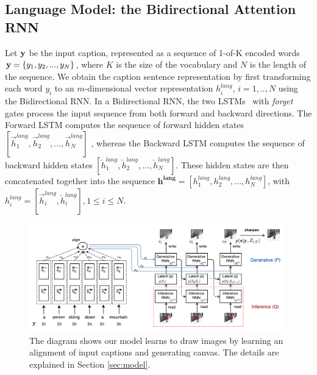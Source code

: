 \documentclass{article} %
\newcommand{\hlang}{h^{lang}}
\newcommand{\hlangall}{\boldsymbol{h^{lang}}}
\newcommand{\icaption}{{\bf{y}}}
\newcommand{\oimage}{{\bf{x}}}
\begin{document}
\subsection{Language Model: the Bidirectional Attention RNN}
\label{sec:lang}
Let $\icaption$ be the input caption, represented as a sequence
of 1-of-K encoded words 
${\bf y} = \{y_{1}, y_{2}, ..., y_{N}\}$, 
where $K$ is the size of the vocabulary and $N$ is the length of the sequence.
We obtain the caption sentence representation by first 
transforming each word $y_{i}$ to an $m$-dimensional 
vector representation $\hlang_{i}$, $i=1,..,N$ using the Bidirectional RNN. In a Bidirectional RNN, the two LSTMs~\citep{hochreiter_lstm} with \textit{forget} gates 
\citep{gers_forget} process the input sequence from both forward and backward directions. The Forward LSTM computes the sequence of forward hidden states $[\overrightarrow{h}^{lang}_{1}, \overrightarrow{h}^{lang}_{2}, ..., \overrightarrow{h}^{lang}_{N}]$ , whereas the Backward LSTM computes the sequence of backward hidden states $[\overleftarrow{h}^{lang}_{1}, \overleftarrow{h}^{lang}_{2}, ..., \overleftarrow{h}^{lang}_{N}]$. 
These hidden states are then concatenated together 
into the sequence $\hlangall = [\hlang_{1}, \hlang_{2}, ..., \hlang_{N}]$, 
with $\hlang_{i} = [\overrightarrow{h}^{lang}_{i}, \overleftarrow{h}^{lang}_{i}], 1\leq i\leq N$.


\begin{figure}[t!]
\captionsetup[subfigure]{labelformat=empty}
\begin{center}
\includegraphics[width=0.99\textwidth]{figures/alignDrawAnnotated.pdf}\quad
%
\end{center}
\caption{The diagram shows our model learns to draw images by learning an alignment of input captions and generating canvas. The details are explained in Section \ref{sec:model}.}
\label{fig:figmodel}
\vspace{-0.3cm}
\end{figure}
\end{document}
